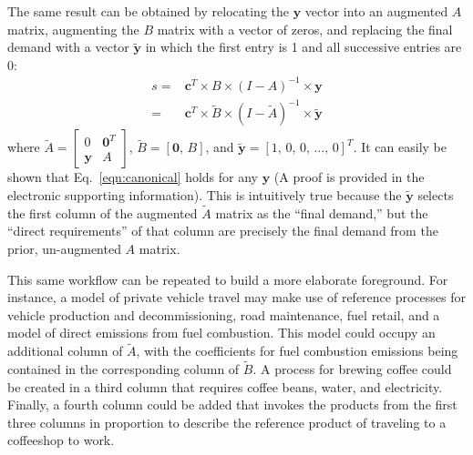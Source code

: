 The same result can be obtained by relocating the $\mathbf{y}$ vector into an augmented $A$ matrix, augmenting the $B$ matrix with a vector of zeros, and replacing the final demand with a vector $\tilde{\mathbf{y}}$ in which the first entry is 1 and all successive entries are 0:
\begin{equation}
  \begin{array}{cc}
s =& \mathbf{c}^T\times B\times\left(I-A\right)^{-1}\times\mathbf{y} \\
 =& \mathbf{c}^{T}\times\tilde{B}\times\left(I-\tilde{A}\right)^{-1}\times\tilde{\mathbf{y}}
  \end{array}
  \label{eqn:canonical}
\end{equation}
where
$\tilde{A} = \left[\begin{smallmatrix} 0 & \mathbf{0}^T \\ \mathbf{y} & A  \end{smallmatrix}\right]$,
$\tilde{B} = [ \mathbf{0},\, B ]$, and $\tilde{\mathbf{y}} =  [ 1,\, 0,\, 0 ,\,\ldots,\, 0]^{T}$.
It can easily be shown that Eq.~\ref{eqn:canonical} holds for any $\mathbf{y}$  (A proof is provided in the electronic supporting information).  This is intuitively true because the $\tilde{\mathbf{y}}$ selects the first column of the augmented $\tilde{A}$ matrix as the ``final demand,'' but the ``direct requirements'' of that column are precisely the final demand from the prior, un-augmented $A$ matrix.  

This same workflow can be repeated to build a more elaborate foreground.  For instance, a model of private vehicle travel may make use of reference processes for vehicle production and decommissioning, road maintenance, fuel retail, and a model of direct emissions from fuel combustion.  This model could occupy an additional column of $\tilde{A}$, with the coefficients for fuel combustion emissions being contained in the corresponding column of $\tilde{B}$.  A process for brewing coffee could be created in a third column that requires coffee beans, water, and electricity. Finally, a fourth column could be added that invokes the products from the first three columns in proportion to describe the reference product of traveling to a coffeeshop to work.%

